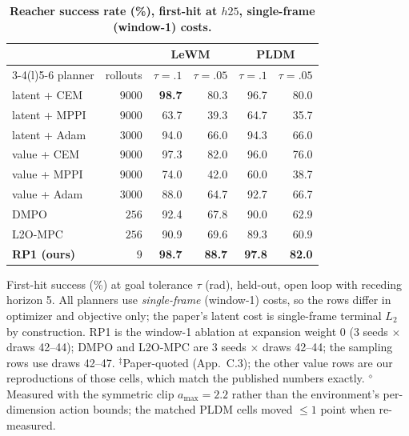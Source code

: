 \begin{table}[t]
  \centering
  \captionsetup{font=small,skip=4pt}
  \caption{\textbf{Reacher success rate (\%), first-hit at $h25$, single-frame
  (window-1) costs.}}
  \label{tab:reacher}
  \footnotesize
  \renewcommand{\arraystretch}{1.08}
  \begin{tabular*}{\linewidth}{
    @{\extracolsep{\fill}}lrrrrr@{}
  }
  \toprule
  & & \multicolumn{2}{c}{LeWM} & \multicolumn{2}{c}{PLDM} \\
  \cmidrule(lr){3-4}\cmidrule(l){5-6}
  planner & rollouts & $\tau{=}.1$ & $\tau{=}.05$ & $\tau{=}.1$ & $\tau{=}.05$ \\
  \midrule
  latent + CEM   & $9000$ & \textbf{98.7} & 80.3 & 96.7 & 80.0 \\
  latent + MPPI  & $9000$ & 63.7 & 39.3 & 64.7 & 35.7 \\
  latent + Adam  & $3000$ & 94.0 & 66.0 & 94.3 & 66.0 \\
  \midrule
  value + CEM    & $9000$ & 97.3 & 82.0 & 96.0 & 76.0 \\
  value + MPPI   & $9000$ & 74.0 & 42.0 & 60.0\rlap{$^{\ddagger}$} & 38.7\rlap{$^{\ddagger}$} \\
  value + Adam   & $3000$ & 88.0 & 64.7 & 92.7\rlap{$^{\ddagger}$} & 66.7\rlap{$^{\ddagger}$} \\
  \midrule
  DMPO           & $256$  & 92.4\rlap{$^{\diamond}$} & 67.8\rlap{$^{\diamond}$} & 90.0 & 62.9 \\
  L2O-MPC        & $256$  & 90.9 & 69.6 & 89.3 & 60.9 \\
  \midrule
  \textbf{RP1 (ours)} & $9$
  & \textbf{98.7} & \textbf{88.7}
  & \textbf{97.8} & \textbf{82.0} \\
  \bottomrule
  \end{tabular*}

  \vspace{3pt}
  {\footnotesize\setlength{\parindent}{0pt}\raggedright
  \indent First-hit success (\%) at goal tolerance $\tau$ (rad), held-out,
  open loop with receding horizon 5. All planners use \emph{single-frame}
  (window-1) costs, so the rows differ in optimizer and objective only; the
  paper's latent cost is single-frame terminal $L_2$ by construction. RP1 is the
  window-1 ablation at expansion weight $0$ (3 seeds $\times$ draws 42--44);
  DMPO and L2O-MPC are 3 seeds $\times$ draws 42--44; the sampling rows use
  draws 42--47.
  $^{\ddagger}$Paper-quoted (App.~C.3); the other value rows are our
  reproductions of those cells, which match the published numbers exactly.
  $^{\diamond}$Measured with the symmetric clip $a_{\max}{=}2.2$ rather than the
  environment's per-dimension action bounds; the matched PLDM cells moved
  $\le 1$ point when re-measured.\par}
\end{table}

